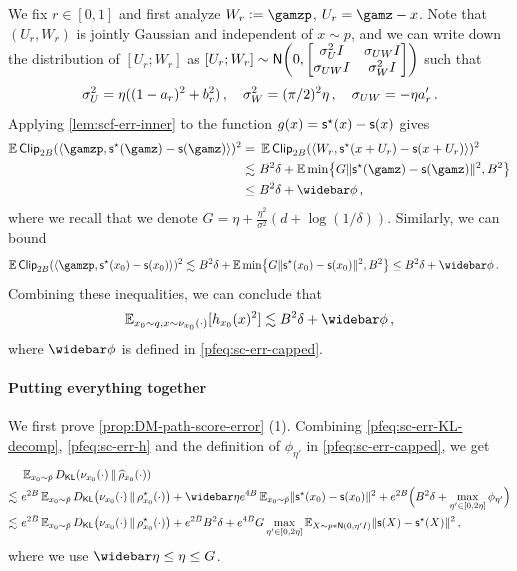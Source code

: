 We fix $r\in[0,1]$ and first analyze $W_r\ldef \gamzp$, $U_r=\gamz-x$.
Note that $(U_r,W_r)$ is jointly Gaussian and independent of $x\sim p$, and we can write down the distribution of $[U_r;W_r]$ as $[U_r;W_r]\sim \normal{0,\begin{bmatrix}
    \sigma_U^2\Id & \sigma_{UW}\Id \\
    \sigma_{UW}\Id & \sigma_W^2\Id
\end{bmatrix}}$ such that 
\begin{align*}
    \sigma_U^2=\eta((1-a_{r})^2+b_{r}^2)\,, \quad
    \sigma_W^2=(\pi/2)^2\eta\,, \quad
    \sigma_{UW}=-\eta a_{r}'\,.
\end{align*}
Applying \cref{lem:scf-err-inner} to the function $g(x)=\mathsf{s}^\star(x)-\mathsf{s}(x)$ gives
\begin{align*}
    \En \pclip[2B]{\tri{\gamzp, \scfs(\gamz)-\scf(\gamz)}}^2
    =&~\En \pclip[2B]{\tri{W_r, \scfs(x+U_r)-\scf(x+U_r)}}^2 \\
    \leqsim&~ B^2\delta+\En\min\crl*{ G\nrm{\scfs(\gamz)-\scf(\gamz)}^2, B^2} \\
    \leq&~ B^2\delta+\phibar\,,
\end{align*}
where we recall that we denote $G=\eta+\frac{\eta^2}{\sigma^2}(d+\log(1/\delta))$. Similarly, we can bound
\begin{align*}
    \En \pclip[2B]{\tri{\gamzp, \scfs(\xz)-\scf(\xz)}}^2
    \leqsim&~ B^2\delta+\En\min\crl*{ G\nrm{\scfs(\xz)-\scf(\xz)}^2, B^2} 
    \leq B^2\delta+\phibar\,.
\end{align*}
Combining these inequalities, we can conclude that
\begin{align}\label{pfeq:sc-err-h}
\begin{aligned}
    \En_{\xz\sim q, x\sim \piz{\cdot}}[h_{\xz}(x)^2]
    \leqsim B^2\delta+\phibar\,,
\end{aligned}
\end{align}
where $\phibar$ is defined in \cref{pfeq:sc-err-capped}.

\paragraph{Putting everything together}
We first prove \cref{prop:DM-path-score-error} (1). Combining \cref{pfeq:sc-err-KL-decomp}, \cref{pfeq:sc-err-h} and the definition of $\phi_{\eta'}$ in \cref{pfeq:sc-err-capped}, we get
\begin{align*}
    &~ \En_{\xz\sim \breve p}\Dkl{\piz{\cdot}}{\rhohz{\cdot}} \\
    \leqsim&~ e^{2B}\En_{\xz\sim \breve p}\Dkl{\piz{\cdot}}{\rhosz{\cdot}} 
    +\etabar e^{4B} \En_{\xz\sim \breve p}\nrm{\scfs(\xz)-\scf(\xz)}^2
    +e^{2B}\prn[\Big]{ B^2\delta+\max_{\eta'\in[0,2\eta]} \phi_{\eta'} } \\
    \leqsim&~ e^{2B}\En_{\xz\sim \breve p}\Dkl{\piz{\cdot}}{\rhosz{\cdot}} + e^{2B}B^2\delta + e^{4B} G \max_{\eta'\in[0,2\eta]}\En_{X\sim \pconv{\eta'}} \nrm{\scf(X)-\scfs(X)}^2\,,
\end{align*}
where we use $\etabar\leq \eta\leq G$.

